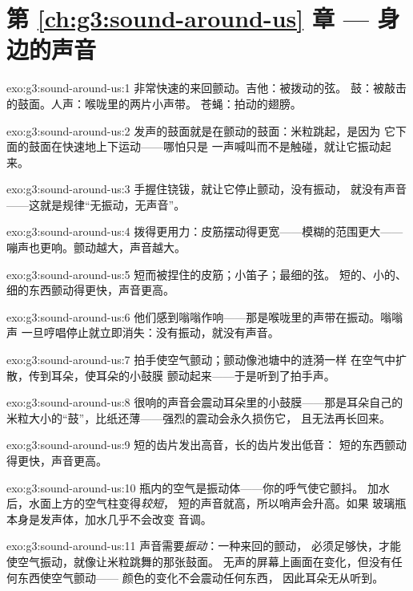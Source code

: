 \section*{第 \ref{ch:g3:sound-around-us} 章 --- 身边的声音}

\begin{solution}{exo:g3:sound-around-us:1}
非常快速的来回颤动。吉他：被拨动的弦。
鼓：被敲击的鼓面。人声：喉咙里的两片小声带。
苍蝇：拍动的翅膀。
\end{solution}

\begin{solution}{exo:g3:sound-around-us:2}
发声的鼓面就是在颤动的鼓面：米粒跳起，是因为
它下面的鼓面在快速地上下运动——哪怕只是
一声喊叫而不是触碰，就让它振动起来。
\end{solution}

\begin{solution}{exo:g3:sound-around-us:3}
手握住铙钹，就让它停止颤动，没有振动，
就没有声音——这就是规律“无振动，无声音”。
\end{solution}

\begin{solution}{exo:g3:sound-around-us:4}
拨得更用力：皮筋摆动得更宽——模糊的范围更大——
嘣声也更响。颤动越大，声音越大。
\end{solution}

\begin{solution}{exo:g3:sound-around-us:5}
短而被捏住的皮筋；小笛子；最细的弦。
短的、小的、细的东西颤动得更快，声音更高。
\end{solution}

\begin{solution}{exo:g3:sound-around-us:6}
他们感到嗡嗡作响——那是喉咙里的声带在振动。嗡嗡声
一旦哼唱停止就立即消失：没有振动，就没有声音。
\end{solution}

\begin{solution}{exo:g3:sound-around-us:7}
拍手使空气颤动；颤动像池塘中的涟漪一样
在空气中扩散，传到耳朵，使耳朵的小鼓膜
颤动起来——于是听到了拍手声。
\end{solution}

\begin{solution}{exo:g3:sound-around-us:8}
很响的声音会震动耳朵里的小鼓膜——那是耳朵自己的
米粒大小的“鼓”，比纸还薄——强烈的震动会永久损伤它，
且无法再长回来。
\end{solution}

\begin{solution}{exo:g3:sound-around-us:9}
短的齿片发出高音，长的齿片发出低音：
短的东西颤动得更快，声音更高。
\end{solution}

\begin{solution}{exo:g3:sound-around-us:10}
瓶内的空气是振动体——你的呼气使它颤抖。
加水后，水面上方的空气柱变得\emph{较短}，
短的声音就高，所以哨声会升高。如果
玻璃瓶本身是发声体，加水几乎不会改变
音调。
\end{solution}

\begin{solution}{exo:g3:sound-around-us:11}
声音需要\emph{振动}：一种来回的颤动，
必须足够快，才能使空气振动，就像让米粒跳舞的那张鼓面。
无声的屏幕上画面在变化，但没有任何东西使空气颤动——
颜色的变化不会震动任何东西，
因此耳朵无从听到。
\end{solution}
